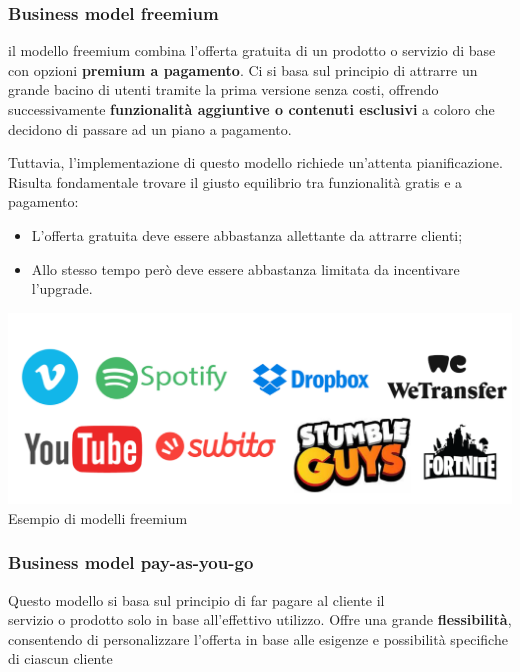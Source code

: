 \documentclass[14pt]{extarticle}
\begin{document}
\subsubsection{Business model freemium}

il modello freemium combina l'offerta gratuita di un prodotto o servizio di base
con opzioni \textbf{premium a pagamento}. Ci si basa sul principio di attrarre
un grande bacino di utenti tramite la prima versione senza costi, offrendo
successivamente \textbf{funzionalità aggiuntive o contenuti esclusivi} a coloro
che decidono di passare ad un piano a pagamento.

Tuttavia, l'implementazione di questo modello richiede un'attenta
pianificazione. Risulta fondamentale trovare il giusto equilibrio tra
funzionalità gratis e a pagamento:

\begin{itemize}
    \item L'offerta gratuita deve essere abbastanza allettante da attrarre
    clienti;
    \item Allo stesso tempo però deve essere abbastanza limitata da incentivare
    l'upgrade. 
\end{itemize}

\begin{center}
    \includegraphics[scale=0.50]{images/freemium.png}
    Esempio di modelli freemium
\end{center}

\newpage
\subsubsection{Business model pay-as-you-go}

Questo modello si basa sul principio di far pagare al cliente il \\servizio o
prodotto solo in base all'effettivo utilizzo. Offre una grande
\textbf{flessibilità}, consentendo di personalizzare l'offerta in base alle
esigenze e possibilità specifiche di ciascun cliente
\end{document}
